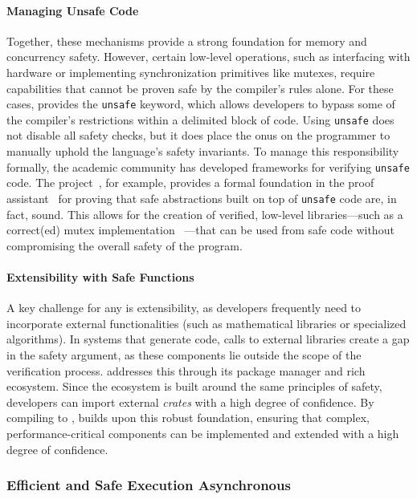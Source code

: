 \paragraph{Managing Unsafe Code}
Together, these mechanisms provide a strong foundation for memory and concurrency safety. However,
certain low-level operations, such as interfacing with hardware or implementing synchronization
primitives like mutexes, require capabilities that cannot be proven safe by the compiler's rules
alone. For these cases, \Rust provides the \texttt{unsafe} keyword, which allows developers to
bypass some of the compiler's restrictions within a delimited block of code.
%
Using \texttt{unsafe} does not disable all safety checks, but it does place the onus on the
programmer to manually uphold the language's safety invariants. To manage this responsibility
formally, the academic community has developed frameworks for verifying \texttt{unsafe} code. The
\RustBelt project~\cite{DBLP:journals/pacmpl/0002JKD18}, for example, provides a formal foundation
in the \Rocq proof assistant~\cite{rocq} for proving that safe abstractions built on top of
\texttt{unsafe} code are, in fact, sound. This allows for the creation of verified, low-level
libraries---such as a correct(ed) mutex implementation~\cite{rustbelt_mutex_proof,rust_mutex_issue}%
---that can be used from safe \Rust code without compromising the overall safety of the program.

\paragraph{Extensibility with Safe Functions}
A key challenge for any \dsl is extensibility, as developers frequently need to incorporate external
functionalities (such as mathematical libraries or specialized algorithms). In systems that generate
\Ci code, calls to external libraries create a gap in the safety argument, as these components lie
outside the scope of the verification process. \Rust addresses this through its package manager and
rich ecosystem. Since the ecosystem is built around the same principles of safety, developers can
import external \emph{crates} with a high degree of confidence. By compiling to \Rust, \GRust builds
upon this robust foundation, ensuring that complex, performance-critical components can be
implemented and extended with a high degree of confidence.

\subsubsection{Efficient and Safe Execution \via Asynchronous \Rust}
\label{sec:grust:implem:design_principles:async_rust}

